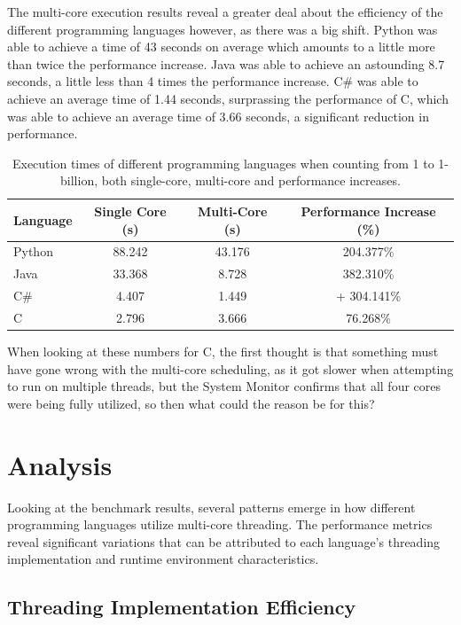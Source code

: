\documentclass[12pt,a4paper]{article}
\begin{document}
The multi-core execution results reveal a greater deal about the efficiency of the different programming languages however, as there was a big shift. Python was able to achieve a time of 43 seconds on average which amounts to a little more than twice the performance increase. Java was able to achieve an astounding 8.7 seconds, a little less than 4 times the performance increase. C\# was able to achieve an average time of 1.44 seconds, surprassing the performance of C, which was able to achieve an average time of 3.66 seconds, a significant reduction in performance.

\begin{table}[H]
    \centering
    \begin{tabular}{|l|c|c|c|}
        \hline
        Language & Single Core (s) & Multi-Core (s) & Performance Increase (\%) \\
        \hline
        Python & 88.242 & 43.176 & 204.377\% \\
        Java & 33.368 & 8.728 & 382.310\% \\
        C\# & 4.407 & 1.449 & + 304.141\% \\
        C & 2.796 & 3.666 & 76.268\% \\
        \hline
    \end{tabular}
    \captionsetup{font=small, justification=centering}
    \caption{Execution times of different programming languages when counting from 1 to 1-billion, both single-core, multi-core and performance increases.}
    \label{tab:exec-times}
\end{table}

When looking at these numbers for C, the first thought is that something must have gone wrong with the multi-core scheduling, as it got slower when attempting to run on multiple threads, but the System Monitor confirms that all four cores were being fully utilized, so then what could the reason be for this?

\section{Analysis}

Looking at the benchmark results, several patterns emerge in how different programming languages utilize multi-core threading. The performance metrics reveal significant variations that can be attributed to each language's threading implementation and runtime environment characteristics.

\subsection{Threading Implementation Efficiency}
\end{document}
